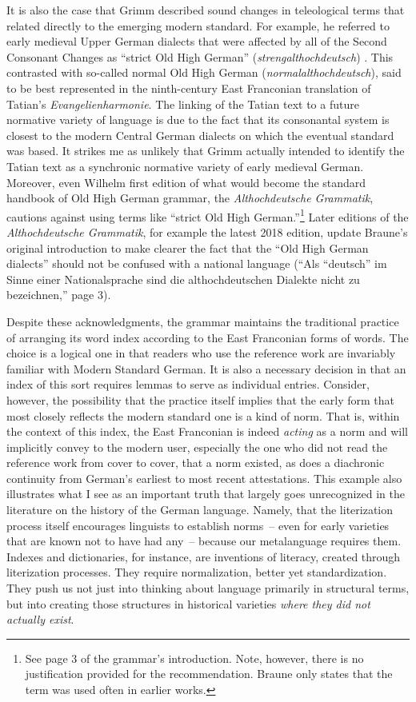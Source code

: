 It is also the case that Grimm described sound changes in teleological terms that related directly to the emerging modern standard. For example, he referred to early medieval Upper German dialects that were affected by all of the Second Consonant Changes as “strict Old High German” (\textit{strengalthochdeutsch}) \citep[13]{Braune2018}. This contrasted with so-called normal Old High German (\textit{normalalthochdeutsch}), said to be best represented in the ninth-century East Franconian translation of Tatian’s \textit{Evangelienharmonie}. The linking of the Tatian text to a future normative variety of language is due to the fact that its consonantal system is closest to the modern Central German dialects on which the eventual standard was based. It strikes me as unlikely that Grimm actually intended to identify the Tatian text as a synchronic normative variety of early medieval German. Moreover, even Wilhelm  first edition of what would become the standard handbook of Old High German grammar, the \textit{Althochdeutsche Grammatik}, cautions against using terms like “strict Old High German.”\footnote{See page 3 of the grammar’s introduction. Note, however, there is no justification provided for the recommendation. Braune only states that the term was used often in earlier works.} Later editions of the \textit{Althochdeutsche Grammatik}, for example the latest 2018 edition, update Braune’s original introduction to make clearer the fact that the “Old High German dialects” should not be confused with a national language (“Als “deutsch” im Sinne einer Nationalsprache sind die althochdeutschen Dialekte nicht zu bezeichnen,” page 3).

Despite these acknowledgments, the grammar maintains the traditional practice of arranging its word index according to the East Franconian forms of words. The choice is a logical one in that readers who use the reference work are invariably familiar with Modern Standard German. It is also a necessary decision in that an index of this sort requires lemmas to serve as individual entries. Consider, however, the possibility that the practice itself implies that the early form that most closely reflects the modern standard one is a kind of norm. That is, within the context of this index, the East Franconian is indeed \textit{acting} as a norm and will implicitly convey to the modern user, especially the one who did not read the reference work from cover to cover, that a norm existed, as does a diachronic continuity from German’s earliest to most recent attestations. This example also illustrates what I see as an important truth that largely goes unrecognized in the literature on the history of the German language. Namely, that the literization process itself encourages linguists to establish norms~-- even for early varieties that are known not to have had any~-- because our metalanguage requires them. Indexes and dictionaries, for instance, are inventions of literacy, created through literization processes. They require normalization, better yet standardization. They push us not just into thinking about language primarily in structural terms, but into creating those structures in historical varieties \textit{where they did not actually exist}. 

